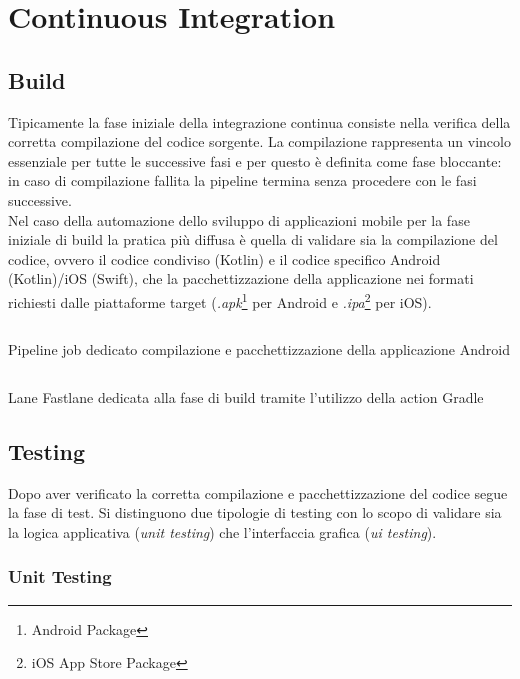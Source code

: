 \section{Continuous Integration}

\subsection{Build}
Tipicamente la fase iniziale della integrazione continua consiste nella verifica della corretta compilazione del codice sorgente. La compilazione rappresenta un vincolo essenziale per tutte le successive fasi e per questo è definita come fase bloccante: in caso di compilazione fallita la pipeline termina senza procedere con le fasi successive.\\
Nel caso della automazione dello sviluppo di applicazioni mobile per la fase iniziale di build la pratica più diffusa è quella di validare sia la compilazione del codice, ovvero il codice condiviso (Kotlin) e il codice specifico Android (Kotlin)/iOS (Swift), che la pacchettizzazione della applicazione nei formati richiesti dalle piattaforme target (\textit{.apk}\footnote{Android Package} per Android e \textit{.ipa}\footnote{iOS App Store Package} per iOS).

\begin{listing}[H]
\inputminted{yaml}{code/4-buildjob}
\caption{Pipeline job dedicato compilazione e pacchettizzazione della applicazione Android}
\end{listing}

\begin{listing}[H]
\inputminted{ruby}{code/4-buildft}
\caption{Lane Fastlane dedicata alla fase di build tramite l'utilizzo della action Gradle}
\end{listing}

\subsection{Testing}
Dopo aver verificato la corretta compilazione e pacchettizzazione del codice segue la fase di test. Si distinguono due tipologie di testing con lo scopo di validare sia la logica applicativa (\textit{unit testing}) che l'interfaccia grafica (\textit{ui testing}).
\subsubsection{Unit Testing}

